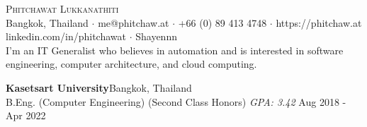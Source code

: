 \vspace*{-40pt}

    

\vspace*{-10pt}
\begin{center}
	{\Huge \scshape {Phitchawat Lukkanathiti}}\\
	Bangkok, Thailand $\cdot$ me@phitchaw.at $\cdot$ +66 (0) 89 413 4748 $\cdot$ https://phitchaw.at \\
        \faLinkedinSquare \vspace{0.4mm} linkedin.com/in/phitchawat $\cdot$ \faGithub \vspace{0.4mm} Shayennn\\
        \vspace{4mm}
        I'm an IT Generalist who believes in automation and is interested in software engineering, computer architecture, and cloud computing.
\end{center}
\vspace{2mm}

\textbf{Kasetsart University}\hfill Bangkok, Thailand\\
B.Eng. (Computer Engineering) (Second Class Honors) \textit{GPA: 3.42} \hfill Aug 2018 - Apr 2022\\
\vspace{2mm}

\vspace{1mm}

